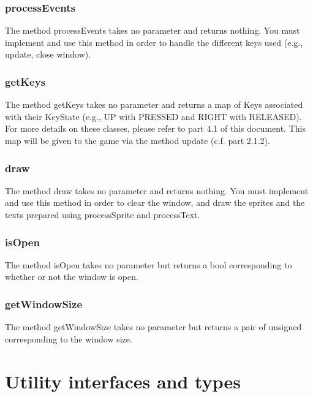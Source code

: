 \documentclass[12pt]{article}
\begin{document}
\subsubsection{processEvents}
The method processEvents takes no parameter and returns nothing.\newline
You must implement and use this method in order to handle the different keys used (e.g., update, close window).
\subsubsection{getKeys}
The method getKeys takes no parameter and returns a map of Keys associated with their KeyState (e.g., UP with PRESSED and RIGHT with RELEASED).\newline
For more details on these classes, please refer to part 4.1 of this document.\newline
This map will be given to the game via the method update (c.f. part 2.1.2).
\subsubsection{draw}
The method draw takes no parameter and returns nothing.\newline
You must implement and use this method in order to clear the window, and draw the sprites and the texts prepared using processSprite and processText.
\subsubsection{isOpen}
The method isOpen takes no parameter but returns a bool corresponding to whether or not the window is open.
\subsubsection{getWindowSize}
The method getWindowSize takes no parameter but returns a pair of unsigned corresponding to the window size.

\section{Utility interfaces and types} \label{utils}
\end{document}
